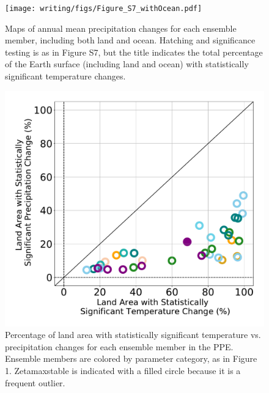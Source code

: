 \documentclass[draft, grl]{agujournal2019}
\begin{document}
\begin{figure}[htb!]
\noindent\texttt{[image: writing/figs/Figure\_S7\_withOcean.pdf]}
\caption{Maps of annual mean precipitation changes for each ensemble member, including both land and ocean. Hatching and significance testing is as in Figure S7, but the title indicates the total percentage of the Earth surface (including land and ocean) with statistically significant temperature changes.}
\label{fig:supp_maps_precip_landAndOcean}
\end{figure}

\begin{figure}[htb!]
\noindent\includegraphics[width=\textwidth]{writing/figs/Figure_S8.pdf}
\caption{Percentage of land area with statistically significant temperature vs. precipitation changes for each ensemble member in the PPE. Ensemble members are colored by parameter category, as in Figure 1. Zetamaxstable is indicated with a filled circle because it is a frequent outlier.}
\label{fig:supp_pct_stat_sig_land}
\end{figure}
\end{document}
